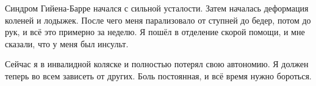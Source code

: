 Синдром Гийена-Барре начался с сильной усталости. Затем началась деформация
коленей и лодыжек. После чего меня парализовало от ступней до бедер, потом до
рук, и всё это примерно за неделю. Я пошёл в отделение скорой помощи, и мне
сказали, что у меня был инсульт.

Сейчас я в инвалидной коляске и полностью потерял свою автономию. Я должен
теперь во всем зависеть от других. Боль постоянная, и всё время нужно бороться.
